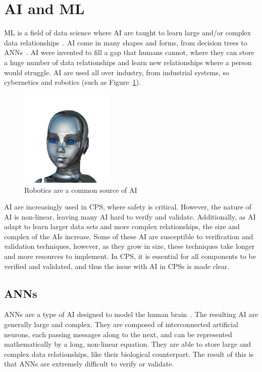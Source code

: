 \section{\acf{AI} and \acf{ML}}
\acf{ML} is a field of data science where \acf{AI} are taught to learn large and/or complex data relationships~\cite{ai}.
\ac{AI} come in many shapes and forms, from decision trees to \acfp{ANN}~\cite{ai-types}.
\ac{AI} were invented to fill a gap that humans cannot, where they can store a huge number of data relationships and learn new relationships where a person would struggle.
\ac{AI} are used all over industry, from industrial systems, so cybernetics and robotics (such as Figure~\ref{fig:ai-girl}).

\begin{figure}[H]
	\centering
	\includegraphics[width=0.4\textwidth]{Content/fig/ai-girl.png}
	\caption{Robotics are a common source of \ac{AI}~\cite{robotgirl-pic} \label{fig:ai-girl}}
\end{figure}

\ac{AI} are increasingly used in \ac{CPS}, where safety is critical.
However, the nature of \ac{AI} is non-linear, leaving many \ac{AI} hard to verify and validate.
Additionally, as \ac{AI} adapt to learn larger data sets and more complex relationships, the size and complex of the \acp{AI} increase.
Some of these \ac{AI} are susceptible to verification and validation techniques, however, as they grow in size, these techniques take longer and more resources to implement.
In \ac{CPS}, it is essential for all components to be verified and validated, and thus the issue with \ac{AI} in \acp{CPS} is made clear.

\subsection{\acfp{ANN}}
\acp{ANN} are a type of \ac{AI} designed to model the human brain~\cite{kohonen1988introduction}.
The resulting \ac{AI} are generally large and complex.
They are composed of interconnected artificial neurons, each passing messages along to the next, and can be represented mathematically by a long, non-linear equation.
They are able to store large and complex data relationships, like their biological counterpart.
The result of this is that \acp{ANN} are extremely difficult to verify or validate.


